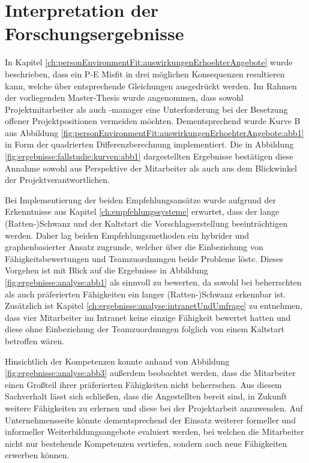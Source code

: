 \section{Interpretation der Forschungsergebnisse}
\label{ch:diskussion:interpretation}
In Kapitel \ref{ch:personEnvironmentFit:auswirkungenErhoehterAngebote} wurde beschrieben, dass ein P-E Misfit in drei möglichen Konsequenzen resultieren kann, welche über entsprechende Gleichungen ausgedrückt werden. Im Rahmen der vorliegenden Master-Thesis wurde angenommen, dass sowohl Projektmitarbeiter als auch -manager eine Unterforderung bei der Besetzung offener Projektpositionen vermeiden möchten. Dementsprechend wurde Kurve B aus Abbildung \ref{fig:personEnvironmentFit:auswirkungenErhoehterAngebote:abb1} in Form der quadrierten Differenzberechnung implementiert. Die in Abbildung \ref{fig:ergebnisse:fallstudie:kurven:abb1} dargestellten Ergebnisse bestätigen diese Annahme sowohl aus Perspektive der Mitarbeiter als auch aus dem Blickwinkel der Projektverantwortlichen. 

Bei Implementierung der beiden Empfehlungsansätze wurde aufgrund der Erkenntnisse aus Kapitel \ref{ch:empfehlungssysteme} erwartet, dass der lange (Ratten-)Schwanz und der Kaltstart die Vorschlagserstellung beeinträchtigen werden. Daher lag beiden Empfehlungsmethoden ein hybrider und graphenbasierter Ansatz zugrunde, welcher über die Einbeziehung von Fähigkeitsbewertungen und Teamzuordnungen beide Probleme löste. Dieses Vorgehen ist mit Blick auf die Ergebnisse in Abbildung \ref{fig:ergebnisse:analyse:abb1} als sinnvoll zu bewerten, da sowohl bei beherrschten als auch präferierten Fähigkeiten ein langer (Ratten-)Schwanz erkennbar ist. Zusätzlich ist Kapitel \ref{ch:ergebnisse:analyse:intranetUndUmfrage} zu entnehmen, dass vier Mitarbeiter im Intranet keine einzige Fähigkeit bewertet hatten und diese ohne Einbeziehung der Teamzuordnungen folglich von einem Kaltstart betroffen wären.

Hinsichtlich der Kompetenzen konnte anhand von Abbildung \ref{fig:ergebnisse:analyse:abb3} außerdem beobachtet werden, dass die Mitarbeiter einen Großteil ihrer präferierten Fähigkeiten nicht beherrschen. Aus diesem Sachverhalt lässt sich schließen, dass die Angestellten bereit sind, in Zukunft weitere Fähigkeiten zu erlernen und diese bei der Projektarbeit anzuwenden. Auf Unternehmensseite könnte dementsprechend der Einsatz weiterer formeller und informeller Weiterbildungsangebote evaluiert werden, bei welchen die Mitarbeiter nicht nur bestehende Kompetenzen vertiefen, sondern auch neue Fähigkeiten erwerben können.

